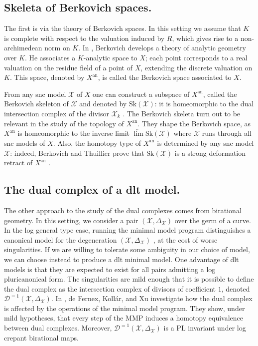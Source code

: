 \documentclass{amsart}%
\numberwithin{equation}{subsection}
\theoremstyle{plain2}
\theoremstyle{definition2}
\theoremstyle{stepstyle}
\theoremstyle{point}
\theoremstyle{subpoint}
\newcommand{\D}{{\mathcal D}}
\newcommand{\cX}{\ensuremath{\mathscr{X}}}
\newcommand{\an}{\mathrm{an}}
\newcommand{\Sk}{\mathrm{Sk}}
\begin{document}
\subsection{Skeleta of Berkovich spaces.} The first is via the theory of Berkovich spaces. In this setting we assume that $K$ is complete with respect to the valuation induced by $R$, which gives rise to a non-archimedean norm on $K$. In \cite{Berkovich1990}, Berkovich develops a theory of analytic geometry over $K$. He associates a $K$-analytic space to $X$; each point corresponds to a real valuation on the residue field of a point of $X$, extending the discrete valuation on $K$. This space, denoted by $X^\an$, is called the Berkovich space associated to $X$.

From any snc model $\cX$ of $X$ one can construct a subspace of $X^\an$, called the Berkovich skeleton of $\cX$ and denoted by $\Sk(\cX)$: it is homeomorphic to the dual intersection complex of the divisor $\cX_k$ \cite{MustataNicaise}.
The Berkovich skeleta turn out to be relevant in the study of the topology of $X^\an$.  They shape the Berkovich space, as $X^\an$ is homeomorphic to the inverse limit $\underleftarrow{\lim}\Sk(\cX)$ where $\cX$ runs through all snc models of $X$. Also, the homotopy type of $X^\an$ is determined by any snc model $\cX$: indeed, Berkovich and Thuillier prove that $\Sk(\cX)$ is a strong deformation retract of $X^\an$ \cite{Berkovich1990, Thuillier2007}.

\subsection{The dual complex of a dlt model.} The other approach to the study of the dual complexes comes from birational geometry. In this setting, we consider a pair $(\cX, \Delta_\cX)$ over the germ of a curve. In the log general type case, running the minimal model program distinguishes a canonical model for the degeneration $(\cX, \Delta_\cX)$ \cite{Alexeev, KollarShepherd-Barron, HaconMcKernanXu}, at the cost of worse singularities. If we are willing to tolerate some ambiguity in our choice of model, we can choose instead to produce a dlt minimal model. One advantage of dlt models is that they are expected to exist for all pairs admitting a log pluricanonical form. The singularities are mild enough that it is possible to define the dual complex as the intersection complex of divisors of coefficient $1$, denoted $\D^{=1}(\cX,\Delta_\cX)$. In \cite{deFernexKollarXu2012}, de Fernex, Koll{\'a}r, and Xu investigate how the dual complex is affected by the operations of the minimal model program. They show, under mild hypotheses, that every step of the MMP induces a homotopy equivalence between dual complexes. Moreover, $\D^{=1}(\cX,\Delta_\cX)$ is a PL invariant under log crepant birational maps.
\end{document}

